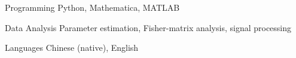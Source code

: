 

\begin{cvskills}

  \cvskill
    {Programming} %
    {Python, Mathematica, MATLAB} %

  \cvskill
    {Data Analysis} %
    {Parameter estimation, Fisher-matrix analysis, signal processing} %

  \cvskill
    {Languages} %
    {Chinese (native), English} %

\end{cvskills}
